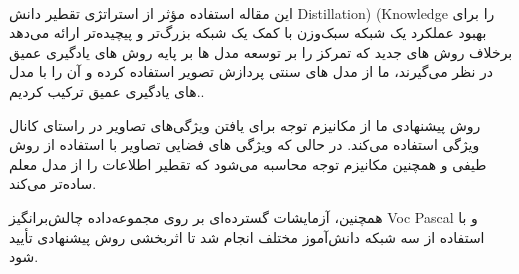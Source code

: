 

‫
‫

این مقاله استفاده مؤثر از استراتژی تقطیر دانش Distillation) (Knowledge را برای بهبود عملکرد یک شبکه سبک‌وزن با کمک یک شبکه بزرگ‌تر و پیچیده‌تر ارائه می‌دهد برخلاف روش های جدید که تمرکز را بر توسعه مدل ها بر پایه روش های یادگیری عمیق در نظر می‌گیرند، ما از مدل های سنتی پردازش تصویر استفاده کرده و آن را با مدل های یادگیری عمیق ترکیب کردیم..

روش پیشنهادی ما از مکانیزم توجه برای یافتن ویژگی‌های تصاویر در راستای کانال ویژگی استفاده می‌کند. در حالی که ویژگی های فضایی تصاویر با استفاده از روش طیفی و همچنین مکانیزم توجه محاسبه می‌شود که تقطیر اطلاعات را از مدل معلم ساده‌تر می‌کند.

همچنین، آزمایشات گسترده‌ای بر روی مجموعه‌داده چالش‌برانگیز Voc Pascal و با استفاده از سه شبکه دانش‌آموز مختلف انجام شد تا اثربخشی روش پیشنهادی تأیید شود.

‫
‫





\pagebreak